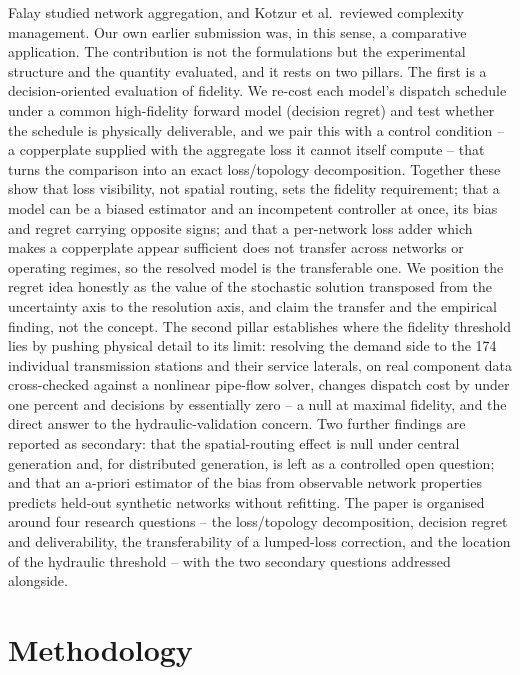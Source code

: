 \documentclass[a4paper,fleqn]{cas-dc}
\begin{document}
Falay studied network aggregation, and Kotzur et al.\ reviewed complexity management. Our
own earlier submission was, in this sense, a comparative application. The contribution is
not the formulations but the experimental structure and the quantity evaluated, and it
rests on two pillars. The first is a decision-oriented evaluation of fidelity. We re-cost
each model's dispatch schedule under a common high-fidelity forward model (decision regret)
and test whether the schedule is physically deliverable, and we pair this with a control
condition -- a copperplate supplied with the aggregate loss it cannot itself compute --
that turns the comparison into an exact loss/topology decomposition. Together these show
that loss visibility, not spatial routing, sets the fidelity requirement; that a model can
be a biased estimator and an incompetent controller at once, its bias and regret carrying
opposite signs; and that a per-network loss adder which makes a copperplate appear
sufficient does not transfer across networks or operating regimes, so the resolved model is
the transferable one. We position the regret idea honestly as the value of the stochastic
solution transposed from the uncertainty axis to the resolution axis, and claim the transfer
and the empirical finding, not the concept. The second pillar establishes where the fidelity
threshold lies by pushing physical detail to its limit: resolving the demand side to the 174
individual transmission stations and their service laterals, on real component data
cross-checked against a nonlinear pipe-flow solver, changes dispatch cost by under one
percent and decisions by essentially zero -- a null at maximal fidelity, and the direct
answer to the hydraulic-validation concern. Two further findings are reported as secondary:
that the spatial-routing effect is null under central generation and, for distributed
generation, is left as a controlled open question; and that an a-priori estimator of the
bias from observable network properties predicts held-out synthetic networks without
refitting. The paper is organised around four research questions -- the loss/topology
decomposition, decision regret and deliverability, the transferability of a lumped-loss
correction, and the location of the hydraulic threshold -- with the two secondary questions
addressed alongside.

\section{Methodology}
\label{sec:methodology}
\end{document}
